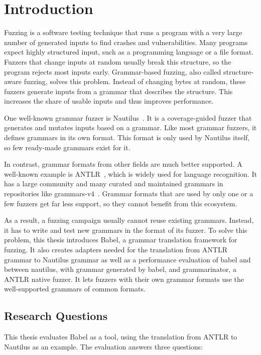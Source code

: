 \documentclass[thesis]{plai}
\begin{document}
\chapter{Introduction}
\label{chapter:introduction}
Fuzzing is a software testing technique that runs a program with a very large number of generated inputs to find crashes and vulnerabilities. Many programs expect highly structured input, such as a programming language or a file format. Fuzzers that change inputs at random usually break this structure, so the program rejects most inputs early. Grammar-based fuzzing, also called structure-aware fuzzing, solves this problem. Instead of changing bytes at random, these fuzzers generate inputs from a grammar that describes the structure. This increases the share of usable inputs and thus improves performance.

One well-known grammar fuzzer is Nautilus~\cite{aschermann19-nautilus}. It is a coverage-guided fuzzer that generates and mutates inputs based on a grammar. Like most grammar fuzzers, it defines grammars in its own format. This format is only used by Nautilus itself, so few ready-made grammars exist for it.

In contrast, grammar formats from other fields are much better supported. A well-known example is ANTLR~\cite{antlr-website}, which is widely used for language recognition. It has a large community and many curated and maintained grammars in repositories like grammars-v4~\cite{grammars-v4}. Grammar formats that are used by only one or a few fuzzers get far less support, so they cannot benefit from this ecosystem.

As a result, a fuzzing campaign usually cannot reuse existing grammars. Instead, it has to write and test new grammars in the format of its fuzzer. To solve this problem, this thesis introduces Babel, a grammar translation framework for fuzzing. It also creates adapters needed for the translation from ANTLR grammar to Nautilus grammar as well as a performance evaluation of babel and between nautilus, with grammar generated by babel, and grammarinator, a ANTLR native fuzzer. It lets fuzzers with their own grammar formats use the well-supported grammars of common formats. \\

\section{Research Questions}
\label{section:research-questions}
This thesis evaluates Babel as a tool, using the translation from ANTLR to Nautilus as an example. The evaluation answers three questions:
\end{document}

